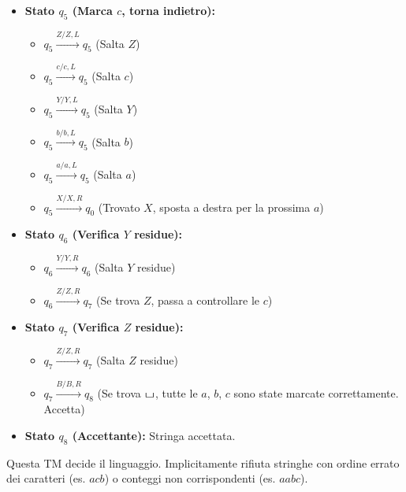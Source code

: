 \documentclass[a4paper]{article}
\theoremstyle{definition} %
\newcommand{\blankS}{\ensuremath{\raisebox{-0.15ex}{\scalebox{1.3}[0.7]{$\sqcup$}}}}
\begin{document}
\begin{itemize}
\begin{itemize}
        \end{itemize}
    \item \textbf{Stato $q_5$ (Marca $c$, torna indietro):}
        \begin{itemize}
            \item $q_5 \xrightarrow{Z / Z, L} q_5$ (Salta $Z$)
            \item $q_5 \xrightarrow{c / c, L} q_5$ (Salta $c$)
            \item $q_5 \xrightarrow{Y / Y, L} q_5$ (Salta $Y$)
            \item $q_5 \xrightarrow{b / b, L} q_5$ (Salta $b$)
            \item $q_5 \xrightarrow{a / a, L} q_5$ (Salta $a$)
            \item $q_5 \xrightarrow{X / X, R} q_0$ (Trovato $X$, sposta a destra per la prossima $a$)
        \end{itemize}
    \item \textbf{Stato $q_6$ (Verifica $Y$ residue):}
        \begin{itemize}
            \item $q_6 \xrightarrow{Y / Y, R} q_6$ (Salta $Y$ residue)
            \item $q_6 \xrightarrow{Z / Z, R} q_7$ (Se trova $Z$, passa a controllare le $c$)
        \end{itemize}
    \item \textbf{Stato $q_7$ (Verifica $Z$ residue):}
        \begin{itemize}
            \item $q_7 \xrightarrow{Z / Z, R} q_7$ (Salta $Z$ residue)
            \item $q_7 \xrightarrow{B / B, R} q_8$ (Se trova \blankS, tutte le $a$, $b$, $c$ sono state marcate correttamente. Accetta)
        \end{itemize}
    \item \textbf{Stato $q_8$ (Accettante):} Stringa accettata.
\end{itemize}
Questa TM decide il linguaggio. Implicitamente rifiuta stringhe con ordine errato dei caratteri (es. $acb$) o conteggi non corrispondenti (es. $aabc$).
\end{document}
